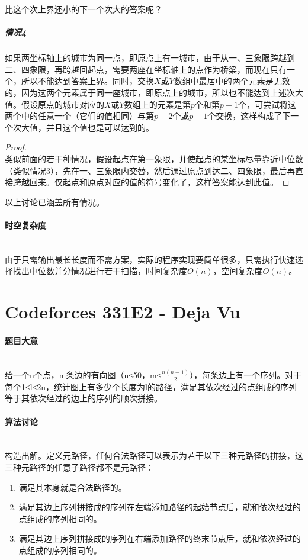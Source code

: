 \documentclass[UTF8]{ctexart}
\newcommand{\myparagraph}[1]{\paragraph{#1}\mbox{}\\}
\theoremstyle{nonumberplain}
\newtheorem{proof}{\hspace{1em}证明：}
\begin{document}
			比这个次上界还小的下一个次大的答案呢？
			
			\subparagraph{情况4}
			如果两坐标轴上的城市为同一点，即原点上有一城市，由于从一、三象限跨越到二、四象限，再跨越回起点，需要两座在坐标轴上的点作为桥梁，而现在只有一个，所以不能达到答案上界。同时，交换$X$或$Y$数组中最居中的两个元素是无效的，因为这两个元素属于同一座城市，即原点上的城市，所以也不能达到上述次大值。假设原点的城市对应的$X$或$Y$数组上的元素是第$p$个和第$p+1$个，可尝试将这两个中的任意一个（它们的值相同）与第$p+2$个或$p-1$个交换，这样构成了下一个次大值，并且这个值也是可以达到的。
			
			\begin{proof}\mbox{}\\
			
				类似前面的若干种情况，假设起点在第一象限，并使起点的某坐标尽量靠近中位数（类似情况3），先在一、三象限内交替，然后通过原点到达二、四象限，最后再直接跨越回来。仅起点和原点对应的值的符号变化了，这样答案能达到此值。
			\end{proof}
			
			以上讨论已涵盖所有情况。
			
		\myparagraph{时空复杂度}
		
			由于只需输出最长长度而不需方案，实际的程序实现要简单很多，只需执行快速选择找出中位数并分情况进行若干扫描，时间复杂度$O(n)$，空间复杂度$O(n)$。
	
	\section{Codeforces 331E2 - Deja Vu}
		
		\myparagraph{题目大意}
		
			给一个n个点，m条边的有向图（n≤50，m≤$\frac{n(n-1)}{2}$），每条边上有一个序列。对于每个1≤l≤2n，统计图上有多少个长度为l的路径，满足其依次经过的点组成的序列等于其依次经过的边上的序列的顺次拼接。
			
		\myparagraph{算法讨论}
		
			构造出解。定义元路径，任何合法路径可以表示为若干以下三种元路径的拼接，这三种元路径的任意子路径都不是元路径：
			
			\begin{enumerate}
				\item 满足其本身就是合法路径的。
				\item 满足其边上序列拼接成的序列在左端添加路径的起始节点后，就和依次经过的点组成的序列相同的。
				\item 满足其边上序列拼接成的序列在右端添加路径的终末节点后，就和依次经过的点组成的序列相同的。
			\end{enumerate}
			
\end{document}
